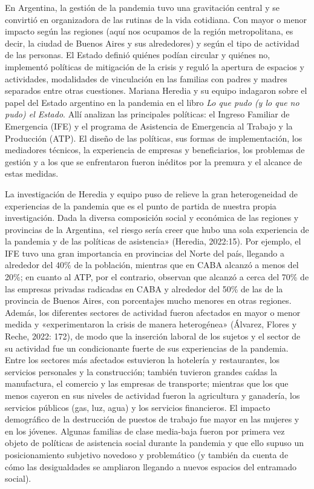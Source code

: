 En Argentina, la gestión de la pandemia tuvo una gravitación central y se convirtió en organizadora de las rutinas de la vida cotidiana. Con mayor o menor impacto según las regiones (aquí nos ocupamos de la región metropolitana, es decir, la ciudad de Buenos Aires y sus alrededores) y según el tipo de actividad de las personas. El Estado definió quiénes podían circular y quiénes no, implementó políticas de mitigación de la crisis y reguló la apertura de espacios y actividades, modalidades de vinculación en las familias con padres y madres separados entre otras cuestiones. Mariana Heredia y su equipo indagaron sobre el papel del Estado argentino en la pandemia en el libro \emph{Lo que pudo (y lo que no pudo) el Estado}. Allí analizan las principales políticas: el Ingreso Familiar de Emergencia (IFE) y el programa de Asistencia de Emergencia al Trabajo y la Producción (ATP). El diseño de las políticas, sus formas de implementación, los mediadores técnicos, la experiencia de empresas y beneficiarios, los problemas de gestión y a los que se enfrentaron fueron inéditos por la premura y el alcance de estas medidas.

La investigación de Heredia y equipo puso de relieve la gran heterogeneidad de experiencias de la pandemia que es el punto de partida de nuestra propia investigación. Dada la diversa composición social y económica de las regiones y provincias de la Argentina, «el riesgo sería creer que hubo una sola experiencia de la pandemia y de las políticas de asistencia» (Heredia, 2022:15). Por ejemplo, el IFE tuvo una gran importancia en provincias del Norte del país, llegando a alrededor del 40\% de la población, mientras que en CABA alcanzó a menos del 20\%; en cuanto al ATP, por el contrario, observan que alcanzó a cerca del 70\% de las empresas privadas radicadas en CABA y alrededor del 50\% de las de la provincia de Buenos Aires, con porcentajes mucho menores en otras regiones. Además, los diferentes sectores de actividad fueron afectados en mayor o menor medida y «experimentaron la crisis de manera heterogénea» (Álvarez, Flores y Reche, 2022: 172), de modo que la inserción laboral de los sujetos y el sector de su actividad fue un condicionante fuerte de sus experiencias de la pandemia. Entre los sectores más afectados estuvieron la hotelería y restaurantes, los servicios personales y la construcción; también tuvieron grandes caídas la manufactura, el comercio y las empresas de transporte; mientras que los que menos cayeron en sus niveles de actividad fueron la agricultura y ganadería, los servicios públicos (gas, luz, agua) y los servicios financieros. El impacto demográfico de la destrucción de puestos de trabajo fue mayor en las mujeres y en los jóvenes. Algunas familias de clase media-baja fueron por primera vez objeto de políticas de asistencia social durante la pandemia y que ello supuso un posicionamiento subjetivo novedoso y problemático (y también da cuenta de cómo las desigualdades se ampliaron llegando a nuevos espacios del entramado social).

